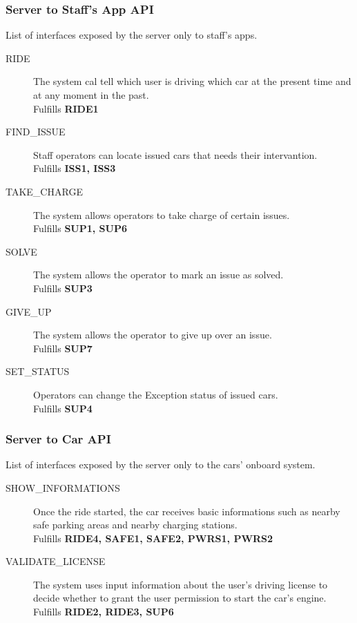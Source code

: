 \documentclass[11pt]{article} %
\begin{document}
\begin{description}
\subsubsection{Server to Staff's App API}
List of interfaces exposed by the server only to staff's apps.
\begin{description}
	\item[RIDE] The system cal tell which user is driving which car at the present time and at any moment in the past. \\ Fulfills \textbf{RIDE1}
	\item[FIND\_ISSUE] Staff operators can locate issued cars that needs their intervantion. \\ Fulfills \textbf{ISS1, ISS3}
	\item[TAKE\_CHARGE] The system allows operators to take charge of certain issues. \\ Fulfills \textbf{SUP1, SUP6}
	\item[SOLVE] The system allows the operator to mark an issue as solved. \\ Fulfills \textbf{SUP3}
	\item[GIVE\_UP] The system allows the operator to give up over an issue. \\ Fulfills \textbf{SUP7}
	\item[SET\_STATUS] Operators can change the Exception status of issued cars. \\ Fulfills \textbf{SUP4}
\end{description}


\subsubsection{Server to Car API}
List of interfaces exposed by the server only to the cars' onboard system.
\begin{description}
	\item[SHOW\_INFORMATIONS] Once the ride started, the car receives basic informations such as nearby safe parking areas and nearby charging stations. \\ Fulfills \textbf{RIDE4, SAFE1, SAFE2, PWRS1, PWRS2}
	\item[VALIDATE\_LICENSE] The system uses input information about the user's driving license to decide whether to grant the user permission to start the car's engine. \\ Fulfills \textbf{RIDE2, RIDE3, SUP6}
\end{description}



\end{description}
\end{document}
